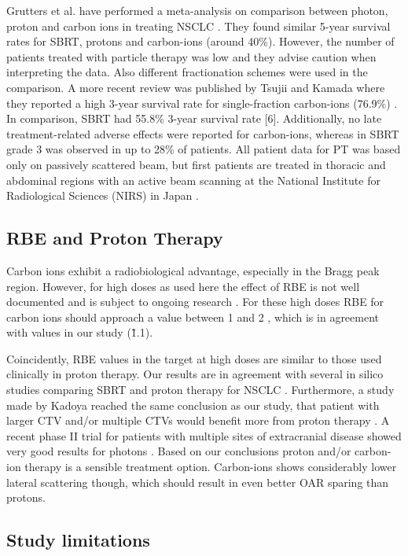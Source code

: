 \documentclass[type=dr, dr=rernat, acm$^3$entcolor=tud7b,colorbacktitle, bigchapter, openright, twoside, 12pt ]{tudthesis}
\begin{document}
Grutters et al. have performed a meta-analysis on comparison between photon, proton and carbon ions in treating NSCLC \cite{Grutters2010}. They found similar 5-year 
survival rates for SBRT, protons and carbon-ions (around 40\%). However, the number of patients treated with particle therapy was low and they
advise caution when interpreting the data. Also different fractionation schemes were used in the comparison. A more recent review was published 
by Tsujii and Kamada where they reported a high 3-year survival rate for single-fraction carbon-ions (76.9\%) \cite{Tsujii2012}. In comparison, SBRT had 55.8\% 
3-year survival rate [6]. Additionally, no late treatment-related adverse effects were reported for carbon-ions, whereas in SBRT grade 3 was observed 
in up to 28\% of patients. All patient data for PT was based only on passively scattered beam, but first patients are treated in thoracic and 
abdominal regions with an active beam scanning at the National Institute for Radiological Sciences (NIRS) in Japan \cite{Mori2013}.

\subsection{RBE and Proton Therapy}

Carbon ions exhibit a radiobiological advantage, especially in the Bragg peak region. However, for high doses as used here the effect of RBE is not well 
documented and is subject to ongoing research \cite{Friedrich2014}. For these high doses RBE for carbon ions should approach a value between 1 and 2 \cite{Carabe2007}, which is in 
agreement with values in our study (\~ 1.1).

Coincidently, RBE values in the target at high doses are similar to those used clinically in proton therapy. Our results are in agreement with several
in silico studies comparing SBRT and proton therapy for NSCLC \cite{Roelofs2012, Kadoya2010, Register2010}. Furthermore, a study made by Kadoya reached the same conclusion as our study,
that patient with larger CTV and/or multiple CTVs would benefit more from proton therapy \cite{Kadoya2010}. A recent phase II trial for patients with multiple sites 
of  extracranial disease showed very good results for photons \cite{Iyengar2014}. Based on our conclusions proton and/or carbon-ion therapy is a sensible treatment 
option. Carbon-ions shows considerably lower lateral scattering though, which should result in even better OAR sparing than protons.

\subsection{Study limitations}
\end{document}
